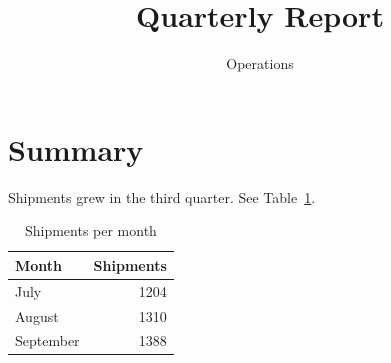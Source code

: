 \documentclass[11pt,a4paper]{article}
\title{Quarterly Report}
\author{Operations}
\begin{document}
\maketitle
\section{Summary}
Shipments grew in the third quarter. See Table~\ref{tab:q3}.
\begin{table}[ht]
\centering
\caption{Shipments per month}\label{tab:q3}
\begin{tabular}{lr}
\toprule
Month & Shipments \\
\midrule
July & 1204 \\
August & 1310 \\
September & 1388 \\
\bottomrule
\end{tabular}
\end{table}
\end{document}
